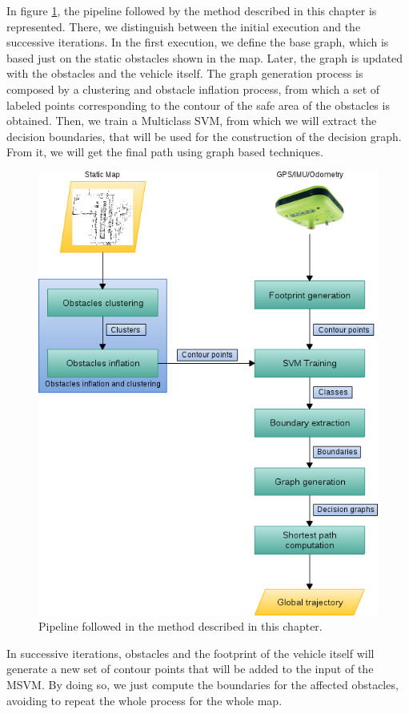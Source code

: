 In figure \ref{fig:cp06_pipeline}, the pipeline followed by the method described in this chapter is represented. There, we distinguish between the initial execution and the successive iterations. In the first execution, we define the base graph, which is based just on the static obstacles shown in the map. Later, the graph is updated with the obstacles and the vehicle itself. The graph generation process is composed by a clustering and obstacle inflation process, from which a set of labeled points corresponding to the contour of the safe area of the obstacles is obtained. Then, we train a Multiclass \ac{SVM}, from which we will extract the decision boundaries, that will be used for the construction of the decision graph. From it, we will get the final path using graph based techniques.

\begin{figure}[h!]
      \centering
      \includegraphics[width=\textwidth, height=\textwidth]{pipeline}
      \caption{ Pipeline followed in the method described in this chapter. }      
      \label{fig:cp06_pipeline}
\end{figure}

In successive iterations, obstacles and the footprint of the vehicle itself will generate a new set of contour points that will be added to the input of the \ac{MSVM}. By doing so, we just compute the boundaries for the affected obstacles, avoiding to repeat the whole process for the whole map.

